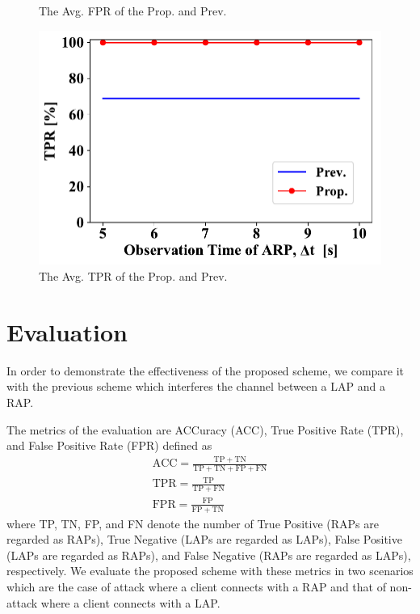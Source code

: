 \documentclass[paper]{ieice}
\begin{document}
\begin{figure}[ht]
\begin{minipage}{0.33\hsize}
\begin{center}
        \end{center}
        \caption{The Avg. FPR of the Prop. and Prev.}
        \label{fig:fpr}
    \end{minipage}
    \begin{minipage}{0.33\hsize}
        \begin{center}
            \includegraphics[scale=0.34]{figure/TPR.pdf}
        \end{center}
        \caption{The Avg. TPR of the Prop. and Prev.}
        \label{fig:tpr}
    \end{minipage}
\vspace{-1zh}
\end{figure}
\section{Evaluation}\label{sec:5}
In order to demonstrate the effectiveness of the proposed scheme, we compare it with the previous scheme \cite{previous} which interferes the channel between a LAP and a RAP.

The metrics of the evaluation are ACCuracy (ACC), True Positive Rate (TPR), and False Positive Rate (FPR) defined as
\begin{gather}
    \mathrm{ACC} = \frac{\mathrm{TP} + \mathrm{TN}}{\mathrm{TP} + \mathrm{TN} + \mathrm{FP} + \mathrm{FN}}\\
    \mathrm{TPR} = \frac{\mathrm{TP}}{\mathrm{TP} + \mathrm{FN}}\\
    \mathrm{FPR} = \frac{\mathrm{FP}}{\mathrm{FP} + \mathrm{TN}}
\end{gather}
where TP, TN, FP, and FN denote the number of True Positive (RAPs are regarded as RAPs), True Negative (LAPs are regarded as LAPs), False Positive (LAPs are regarded as RAPs), and False Negative (RAPs are regarded as LAPs), respectively.
We evaluate the proposed scheme with these metrics in two scenarios which are the case of attack where a client connects with a RAP and that of non-attack where a client connects with a LAP.
\end{document}
